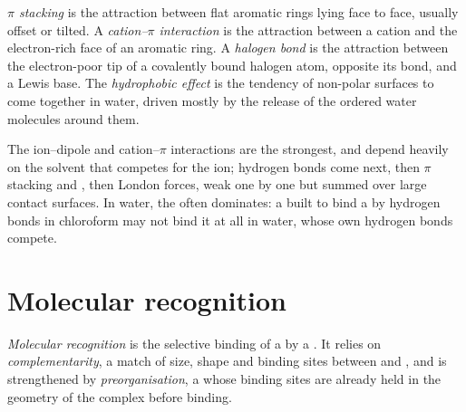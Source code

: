 \begin{definition}\label{def:b3:supramolecular:interactions}
\emph{$\pi$ stacking} is the attraction between flat aromatic
rings lying face to face, usually offset or tilted. A \emph{cation--$\pi$
interaction} is the attraction between a cation and
the electron-rich face of an aromatic ring. A \emph{halogen bond} is the attraction between the electron-poor tip of a covalently bound
halogen atom, opposite its bond, and a Lewis base. The \emph{hydrophobic
effect} is the tendency of non-polar surfaces to come
together in water, driven mostly by the release of the ordered water molecules
around them.
\end{definition}

The ion--dipole and cation--$\pi$ interactions are the strongest, and depend
heavily on the solvent that competes for the ion; hydrogen bonds come next,
then $\pi$ stacking and , then London forces, weak one by one but
summed over large contact surfaces. In water, the  often
dominates: a  built to bind a  by hydrogen bonds in chloroform may not
bind it at all in water, whose own hydrogen bonds compete.

\section{Molecular recognition}

\begin{definition}\label{def:b3:supramolecular:recognition}
\emph{Molecular recognition} is the selective
binding of a  by a . It relies on \emph{complementarity},
a match of size, shape and binding sites between  and , and is
strengthened by \emph{preorganisation}, a  whose
binding sites are already held in the geometry of the complex before binding.
\end{definition}

